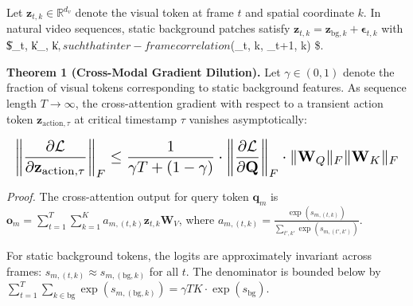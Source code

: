 \documentclass[manuscript,review]{acmart}
\begin{document}
Let $\mathbf{z}_{t, k} \in \mathbb{R}^{d_v}$ denote the visual token at frame $t$ and spatial coordinate $k$. In natural video sequences, static background patches satisfy $\mathbf{z}_{t, k} = \mathbf{z}_{\text{bg}, k} + \boldsymbol{\epsilon}_{t, k}$ with \$\|\boldsymbol{\epsilon}\_{t, k}\| \ll \|\_{, k}\|$, such that inter-frame correlation $\rho(\_{t, k}, \_{t+1, k}) \$.

\textbf{Theorem 1 (Cross-Modal Gradient Dilution).} Let $\gamma \in (0, 1)$ denote the fraction of visual tokens corresponding to static background features. As sequence length $T \to \infty$, the cross-attention gradient with respect to a transient action token $\mathbf{z}_{\text{action}, \tau}$ at critical timestamp $\tau$ vanishes asymptotically:

















\begin{equation}
\resizebox{\columnwidth}{!}{$\displaystyle
\begin{aligned}
\left\| \frac{\partial \mathcal{L}}{\partial \mathbf{z}_{\text{action}, \tau}} \right\|_F \le \frac{1}{\gamma T + (1 - \gamma)} \cdot \left\| \frac{\partial \mathcal{L}}{\partial \mathbf{Q}} \right\|_F \cdot \|\mathbf{W}_Q\|_F \|\mathbf{W}_K\|_F
\end{aligned}
$}
\end{equation}

















\textit{Proof.} The cross-attention output for query token $\mathbf{q}_m$ is $\mathbf{o}_m = \sum_{t=1}^T \sum_{k=1}^K a_{m, (t,k)} \mathbf{z}_{t, k} \mathbf{W}_V$, where $a_{m, (t,k)} = \frac{\exp(s_{m, (t,k)})}{\sum_{t', k'} \exp(s_{m, (t',k')})}$. 

For static background tokens, the logits are approximately invariant across frames: $s_{m, (t, k)} \approx s_{m, (\text{bg}, k)}$ for all $t$. The denominator is bounded below by $\sum_{t=1}^T \sum_{k \in \text{bg}} \exp(s_{m, (\text{bg}, k)}) = \gamma T K \cdot \exp(s_{\text{bg}})$. 
\end{document}
